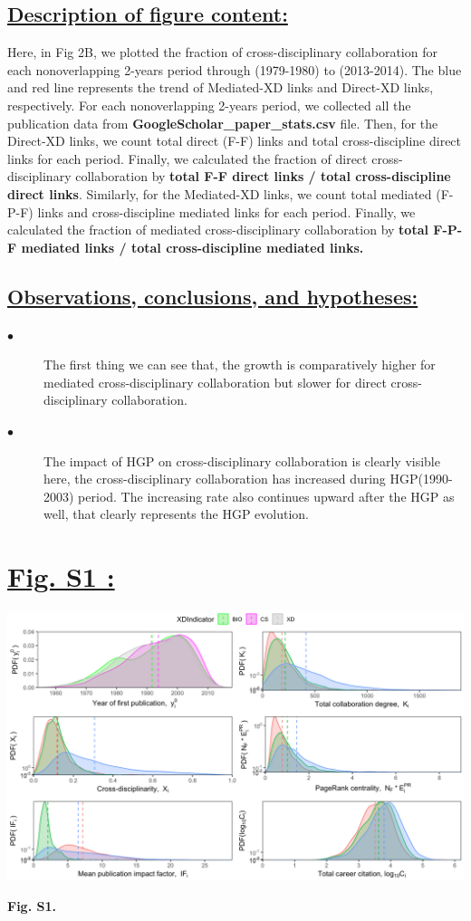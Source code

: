\documentclass{article}\usepackage[]{graphicx}\usepackage[]{color}
\begin{document}
\subsection*{\underline{Description of figure content:}}
\par{Here, in Fig 2B, we plotted the fraction of cross-disciplinary collaboration for each nonoverlapping 2-years period through (1979-1980) to (2013-2014). The blue and red line represents the trend of Mediated-XD links and Direct-XD links, respectively. For each nonoverlapping 2-years period, we collected all the publication data from \textbf{GoogleScholar\_paper\_stats.csv} file. Then, for the Direct-XD links, we count total direct (F-F) links and total cross-discipline direct links for each period. Finally, we calculated the fraction of direct cross-disciplinary collaboration by \textbf{total F-F direct links / total cross-discipline direct links}. Similarly, for the Mediated-XD links, we count total mediated (F-P-F) links and cross-discipline mediated links for each period. Finally, we calculated the fraction of mediated cross-disciplinary collaboration by \textbf{total F-P-F mediated links / total cross-discipline mediated links.}}
\subsection*{\underline{Observations, conclusions, and hypotheses:}}
\begin{description}
  \item[$\bullet$] The first thing we can see that, the growth is comparatively higher for mediated cross-disciplinary collaboration but slower for direct cross-disciplinary collaboration.
  \item[$\bullet$] The impact of HGP on cross-disciplinary collaboration is clearly visible here, the cross-disciplinary collaboration has increased during HGP(1990-2003) period. The increasing rate also continues upward after the HGP as well, that clearly represents the HGP evolution.
\end{description}

\newpage
\section*{\underline{Fig. S1 :}}
\begin{center}
\includegraphics[scale=0.4]{3_ggplot.png}
\newline
\par{\textbf{Fig. S1.}}
\end{center}
\end{document}

